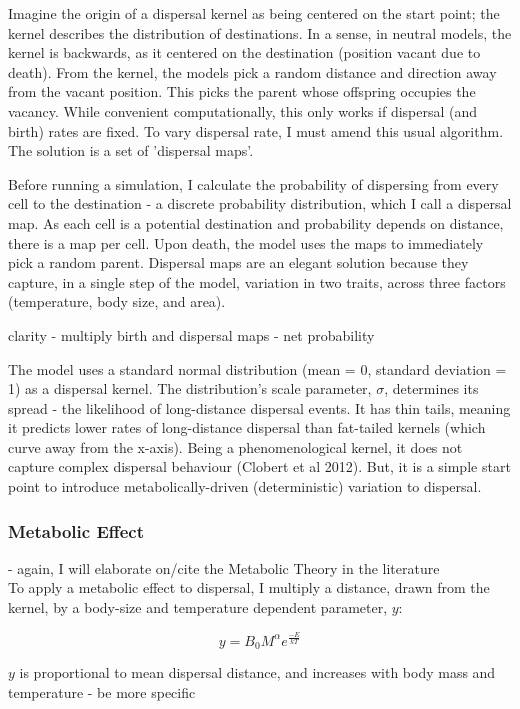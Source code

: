 \documentclass[11pt]{article}
\begin{document}
Imagine the origin of a dispersal kernel as being centered on the start point; the kernel describes the distribution of destinations. In a sense, in neutral models, the kernel is backwards, as it centered on the destination (position vacant due to death). From the kernel, the models pick a random distance and direction away from the vacant position. This picks the parent whose offspring occupies the vacancy. While convenient computationally, this only works if dispersal (and birth) rates are fixed. To vary dispersal rate, I must amend this usual algorithm. The solution is a set of 'dispersal maps'.

Before running a simulation, I calculate the probability of dispersing from every cell to the destination - a discrete probability distribution, which I call a dispersal map. As each cell is a potential destination and probability depends on distance, there is a map per cell.
Upon death, the model uses the maps to immediately pick a random parent. Dispersal maps are an elegant solution because they capture, in a single step of the model, variation in two traits, across three factors (temperature, body size, and area).

clarity - multiply birth and dispersal maps - net probability

The model uses a standard normal distribution (mean = 0, standard deviation = 1) as a dispersal kernel. The distribution's scale parameter, $\sigma$, determines its spread - the likelihood of long-distance dispersal events. It has thin tails, meaning it predicts lower rates of long-distance dispersal than fat-tailed kernels (which curve away from the x-axis). Being a phenomenological kernel, it does not capture complex dispersal behaviour (Clobert et al 2012). But, it is a simple start point to introduce metabolically-driven (deterministic) variation to dispersal.\\

\subsubsection{Metabolic Effect}
- again, I will elaborate on/cite the Metabolic Theory in the literature\\

To apply a metabolic effect to dispersal, I multiply a distance, drawn from the kernel, by a body-size and temperature dependent parameter, $y$:

$$y = B_0 M^\alpha e^{\frac{-E}{kT}}$$

$y$ is proportional to mean dispersal distance, and increases with body mass and temperature - be more specific
\end{document}
